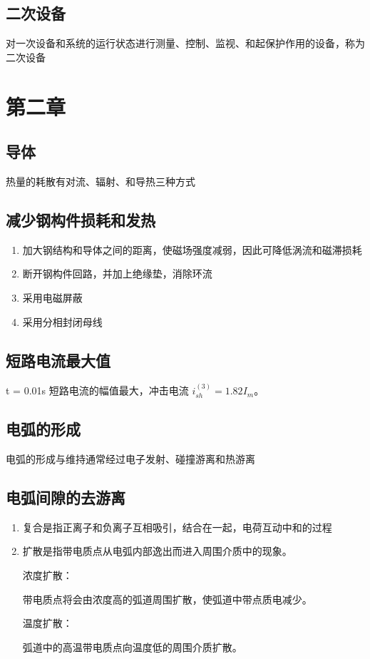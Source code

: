 \documentclass[UTF8]{ctexart}
\begin{document}
\subsection{二次设备}
对一次设备和系统的运行状态进行测量、控制、监视、和起保护作用的设备，称为二次设备
\section{第二章}
\subsection{导体}
热量的耗散有对流、辐射、和导热三种方式
\subsection{减少钢构件损耗和发热}
\begin{enumerate}[(1)]
  \item 加大钢结构和导体之间的距离，使磁场强度减弱，因此可降低涡流和磁滞损耗
  \item 断开钢构件回路，并加上绝缘垫，消除环流
  \item 采用电磁屏蔽
  \item 采用分相封闭母线 
\end{enumerate}
\subsection{短路电流最大值}
t = 0.01s 短路电流的幅值最大，冲击电流 $i_{sh}^{(3)} = 1.82I_{m}$。
\subsection{电弧的形成}
电弧的形成与维持通常经过电子发射、碰撞游离和热游离
\subsection{电弧间隙的去游离}
\begin{enumerate}[1]
   \item 复合是指正离子和负离子互相吸引，结合在一起，电荷互动中和的过程
   \item 扩散是指带电质点从电弧内部逸出而进入周围介质中的现象。
   \par \quad 浓度扩散：
   \par \qquad 带电质点将会由浓度高的弧道周围扩散，使弧道中带点质电减少。 
   \par \quad 温度扩散：
   \par \qquad 弧道中的高温带电质点向温度低的周围介质扩散。 
\end{enumerate}
\end{document}
